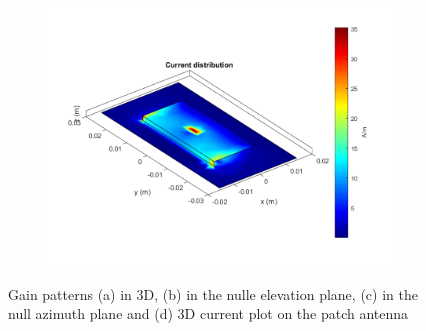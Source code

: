 \documentclass[12pt,a4paper]{article}
\begin{document}
{\begin{figure}[h]
\begin{center}
\begin{subfigure}{0.5\linewidth}
				\caption{}	\end{subfigure}
			\begin{subfigure}{0.5\linewidth}
				\includegraphics[scale=0.5]{pifa_currents.pdf}
				\caption{} \end{subfigure}
			\caption{\selectfont
				\color{gray}
				Gain patterns (a) in 3D, (b) in the nulle elevation plane, (c) in the null azimuth plane and (d) 3D current plot on the patch antenna }
		\end{center}  
	\end{figure}
}
\end{document}
